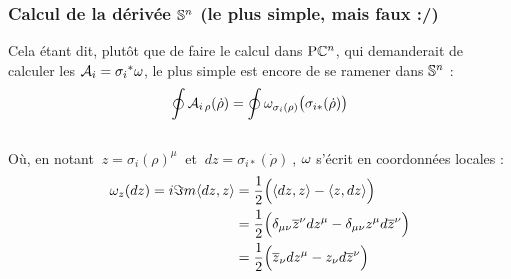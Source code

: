 \subsubsection{Calcul de la dérivée $\S{n}$ (le plus simple, mais faux :/)} \label{ann:wedge2conn}

Cela étant dit, plutôt que de faire le calcul dans $\PC{n}$, qui demanderait de calculer les $\locconn_i = {\sigma_i}^*\conn$, le plus simple est encore de se ramener dans $\S{n}$ :
\[\oint \locconn_{i\, \rho}(\dot{\rho}) = \oint \omega_{\sigma_i(\rho)}\big(\sigma_{i*}(\dot{\rho})\big)\]
\\
Où, en notant $\ z = \sigma_i(\rho)^\mu\ $ et $\ dz = \sigma_{i*}(\dot{\rho})\ $,  $\conn$ s'écrit en coordonnées locales :
\begin{align*}
	\conn_z(dz) = i\Im m \langle dz , z\rangle &= \frac{1}{2}\Big( \langle dz , z \rangle - \langle z, dz \rangle \Big) \\
	&= \frac{1}{2}\Big( \delta_{\mu\nu} \congu{z}^\nu dz^\mu -  \delta_{\mu\nu} z^\mu d\congu{z}^\nu \Big) \\
	&= \frac{1}{2}\Big( \congu{z}_\nu dz^\mu -  z_\nu d\congu{z}^\nu \Big)
\end{align*}
\\


